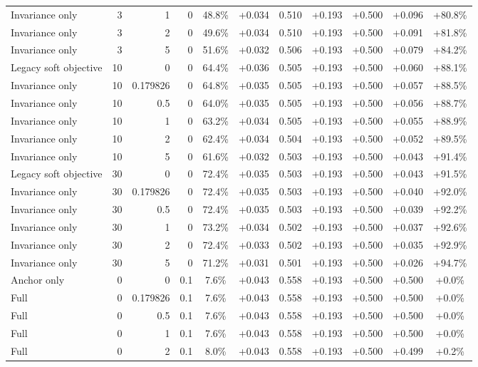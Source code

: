 \begin{table}[htbp]
\begin{tabular}{lrrrccccccc}
Invariance only & 3 & 1 & 0 & 48.8\% & +0.034 & 0.510 & +0.193 & +0.500 & +0.096 & +80.8\% \\
Invariance only & 3 & 2 & 0 & 49.6\% & +0.034 & 0.510 & +0.193 & +0.500 & +0.091 & +81.8\% \\
Invariance only & 3 & 5 & 0 & 51.6\% & +0.032 & 0.506 & +0.193 & +0.500 & +0.079 & +84.2\% \\
Legacy soft objective & 10 & 0 & 0 & 64.4\% & +0.036 & 0.505 & +0.193 & +0.500 & +0.060 & +88.1\% \\
Invariance only & 10 & 0.179826 & 0 & 64.8\% & +0.035 & 0.505 & +0.193 & +0.500 & +0.057 & +88.5\% \\
Invariance only & 10 & 0.5 & 0 & 64.0\% & +0.035 & 0.505 & +0.193 & +0.500 & +0.056 & +88.7\% \\
Invariance only & 10 & 1 & 0 & 63.2\% & +0.034 & 0.505 & +0.193 & +0.500 & +0.055 & +88.9\% \\
Invariance only & 10 & 2 & 0 & 62.4\% & +0.034 & 0.504 & +0.193 & +0.500 & +0.052 & +89.5\% \\
Invariance only & 10 & 5 & 0 & 61.6\% & +0.032 & 0.503 & +0.193 & +0.500 & +0.043 & +91.4\% \\
Legacy soft objective & 30 & 0 & 0 & 72.4\% & +0.035 & 0.503 & +0.193 & +0.500 & +0.043 & +91.5\% \\
Invariance only & 30 & 0.179826 & 0 & 72.4\% & +0.035 & 0.503 & +0.193 & +0.500 & +0.040 & +92.0\% \\
Invariance only & 30 & 0.5 & 0 & 72.4\% & +0.035 & 0.503 & +0.193 & +0.500 & +0.039 & +92.2\% \\
Invariance only & 30 & 1 & 0 & 73.2\% & +0.034 & 0.502 & +0.193 & +0.500 & +0.037 & +92.6\% \\
Invariance only & 30 & 2 & 0 & 72.4\% & +0.033 & 0.502 & +0.193 & +0.500 & +0.035 & +92.9\% \\
Invariance only & 30 & 5 & 0 & 71.2\% & +0.031 & 0.501 & +0.193 & +0.500 & +0.026 & +94.7\% \\
Anchor only & 0 & 0 & 0.1 & 7.6\% & +0.043 & 0.558 & +0.193 & +0.500 & +0.500 & +0.0\% \\
Full & 0 & 0.179826 & 0.1 & 7.6\% & +0.043 & 0.558 & +0.193 & +0.500 & +0.500 & +0.0\% \\
Full & 0 & 0.5 & 0.1 & 7.6\% & +0.043 & 0.558 & +0.193 & +0.500 & +0.500 & +0.0\% \\
Full & 0 & 1 & 0.1 & 7.6\% & +0.043 & 0.558 & +0.193 & +0.500 & +0.500 & +0.0\% \\
Full & 0 & 2 & 0.1 & 8.0\% & +0.043 & 0.558 & +0.193 & +0.500 & +0.499 & +0.2\% \\

\end{tabular}
\end{table}
